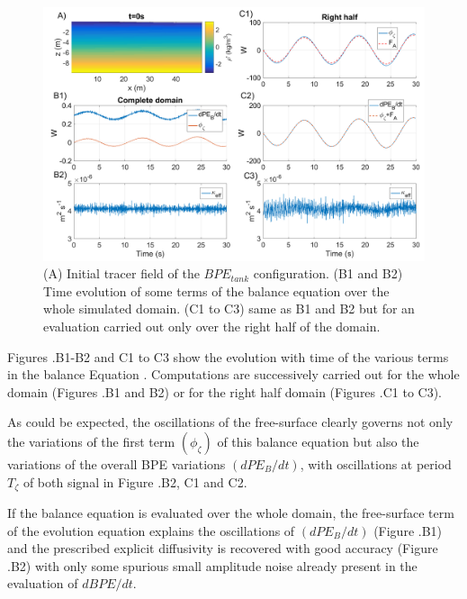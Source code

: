 \begin{figure}[h!]
\centering
\includegraphics[width=1\textwidth]{./CHAP_BPE/Fig_TANK_linS.png}
\caption[Initial tracer field and evaluation of $\kappa_{eff}$ for configuration $BPE_{tank}$]{(A) Initial tracer field of the $BPE_{tank}$ configuration. (B1 and B2) Time evolution of some terms of the balance equation  over the whole simulated domain. (C1 to C3) same as B1 and B2 but for an evaluation carried out only over the right half of the domain.}
\label{figClin}
\end{figure}

Figures .B1-B2 and C1 to C3 show the evolution with time of the various terms in the balance Equation . Computations are successively carried out for the whole domain (Figures .B1 and B2) or for the right half domain (Figures .C1 to C3).

As could be expected, the oscillations of the free-surface clearly governs not only the variations of the first term $(\phi_{\zeta})$ of this balance equation but also the variations of the overall BPE variations $(dPE_B/dt)$, with oscillations at period $T_{\zeta}$ of both signal in Figure .B2, C1 and C2. %

If the balance equation is evaluated over the whole domain, the free-surface term of the evolution equation explains the oscillations of $(dPE_B/dt)$ (Figure .B1) and the prescribed explicit diffusivity is recovered with good accuracy (Figure .B2) with only some spurious small amplitude noise already present in the evaluation of $dBPE/dt$.

